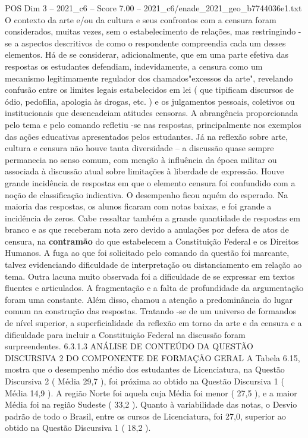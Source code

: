 \begin{textsample}{POS Dim 3 – 2021\_c6 – Score 7.00 – 2021\_c6/enade\_2021\_geo\_b7744036e1.txt}
O contexto da arte e/ou da cultura e seus confrontos com a censura foram considerados, muitas vezes, sem o estabelecimento de relações, mas restringindo -se a aspectos descritivos de como o respondente compreendia cada um desses elementos.
Há de se considerar, adicionalmente, que em uma parte efetiva das respostas os estudantes defendiam, indevidamente, a censura como um mecanismo legitimamente regulador dos chamados"excessos da arte", revelando confusão entre os limites legais estabelecidos em lei ( que tipificam discursos de ódio, pedofilia, apologia às drogas, etc. ) e os julgamentos pessoais, coletivos ou institucionais que desencadeiam atitudes censoras.
A abrangência proporcionada pelo tema e pelo comando refletiu -se nas respostas, principalmente nos exemplos das ações educativas apresentados pelos estudantes.
Já na reflexão sobre arte, cultura e censura não houve tanta diversidade – a discussão quase sempre permanecia no senso comum, com menção à influência da época militar ou associada à discussão atual sobre limitações à liberdade de expressão.
Houve grande incidência de respostas em que o elemento censura foi confundido com a noção de classificação indicativa.
O desempenho ficou aquém do esperado.
Na maioria das respostas, os alunos ficaram com notas baixas, e foi grande a incidência de zeros.
Cabe ressaltar também a grande quantidade de respostas em branco e as que receberam nota zero devido a anulações por defesa de atos de censura, na \textbf{contramão} do que estabelecem a Constituição Federal e os Direitos Humanos.
A fuga ao que foi solicitado pelo comando da questão foi marcante, talvez evidenciando dificuldade de interpretação ou distanciamento em relação ao tema.
Outra lacuna muito observada foi a dificuldade de se expressar em textos fluentes e articulados.
A fragmentação e a falta de profundidade da argumentação foram uma constante.
Além disso, chamou a atenção a predominância do lugar comum na construção das respostas.
Tratando -se de um universo de formandos de nível superior, a superficialidade da reflexão em torno da arte e da censura e a dificuldade para incluir a Constituição Federal na discussão foram surpreendentes. 6.3.1.3 ANÁLISE DE CONTEÚDO DA QUESTÃO DISCURSIVA 2 DO COMPONENTE DE FORMAÇÃO GERAL A Tabela 6.15, mostra que o desempenho médio dos estudantes de Licenciatura, na Questão Discursiva 2 ( Média 29,7 ), foi próxima ao obtido na Questão Discursiva 1 ( Média 14,9 ).
A região Norte foi aquela cuja Média foi menor ( 27,5 ), e a maior Média foi na região Sudeste ( 33,2 ).
Quanto à variabilidade das notas, o Desvio padrão de todo o Brasil, entre os cursos de Licenciatura, foi 27,0, superior ao obtido na Questão Discursiva 1 ( 18,2 ).

\end{textsample}
